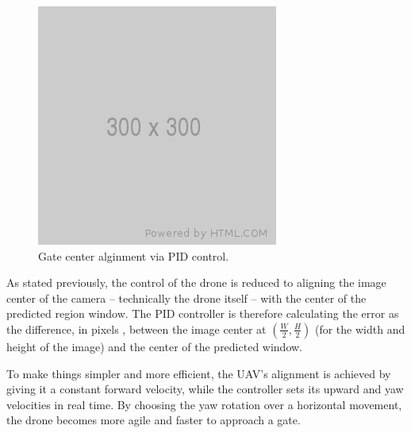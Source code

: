 \begin{figure}[h]
	\centering
	\includegraphics[width=\textwidth]{figure/300x300.png}
	\caption{Gate center alginment via PID control.}
\end{figure}

As stated previously, the control of the drone is reduced to aligning the image
center of the camera -- technically the drone itself -- with the center of the
predicted region window. The PID controller is therefore calculating the error
as the difference, in pixels , between the image center at $(\frac{W}{2},
\frac{H}{2})$ (for the width and height of the image) and the center of the
predicted window.

To make things simpler and more efficient, the UAV's alignment is achieved by
giving it a constant forward velocity, while the controller sets its upward and
yaw velocities in real time. By choosing the yaw rotation over a horizontal
movement, the drone becomes more agile and faster to approach a gate.
